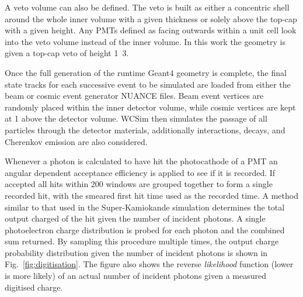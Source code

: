 A veto volume can also be defined. The veto is built as either a concentric shell around the whole
inner volume with a given thickness or solely above the top-cap with a given height. Any PMTs
defined as facing outwards within a unit cell look into the veto volume instead of the inner
volume. In this work the \chipsfive geometry is given a top-cap veto of height
\unit{1.3}{}.

Once the full generation of the runtime Geant4 geometry is complete, the final state tracks for
each successive event to be simulated are loaded from either the beam or cosmic event generator
NUANCE files. Beam event vertices are randomly placed within the inner detector volume, while
cosmic vertices are kept at \unit{1}{} above the detector volume. WCSim then simulates
the passage of all particles through the detector materials, additionally interactions, decays,
and Cherenkov emission are also considered.

Whenever a photon is calculated to have hit the photocathode of a PMT an angular dependent
acceptance efficiency is applied to see if it is recorded. If accepted all hits within
\unit{200}{} windows are grouped together to form a single recorded hit, with the
smeared first hit time used as the recorded time. A method similar to that used in the
Super-Kamiokande simulation determines the total output charged of the hit given the number of
incident photons. A single photoelectron charge distribution is probed for each photon and the
combined sum returned. By sampling this procedure multiple times, the output charge probability
distribution given the number of incident photons is shown in Fig.~\ref{fig:digitisation}. The
figure also shows the reverse \emph{likelihood} function (lower is more likely) of an actual
number of incident photons given a measured digitised charge.

